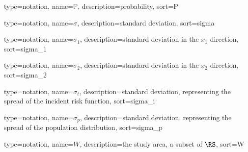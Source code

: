 {%
   type=notation,
   name={\ensuremath{\mathbb{P}}},
   description={probability},
   sort={P}
}

{%
   type=notation,
   name={\ensuremath{\sigma}},
   description={standard deviation},
   sort={sigma}
}

{%
   type=notation,
   name={\ensuremath{\sigma_1}},
   description={standard deviation in the \ensuremath{x_1} direction},
   sort={sigma_1}
}

{%
   type=notation,
   name={\ensuremath{\sigma_2}},
   description={standard deviation in the \ensuremath{x_2} direction},
   sort={sigma_2}
}

{%
   type=notation,
   name={\ensuremath{\sigma_i}},
   description={standard deviation, representing the spread of the incident risk function},
   sort={sigma_i}
}

{%
   type=notation,
   name={\ensuremath{\sigma_p}},
   description={standard deviation, representing the spread of the population distribution},
   sort={sigma_p}
}

{%
   type=notation,
   name={\ensuremath{W}},
   description={the study area, a subset of \ensuremath{\RS}},
   sort={W}
}

